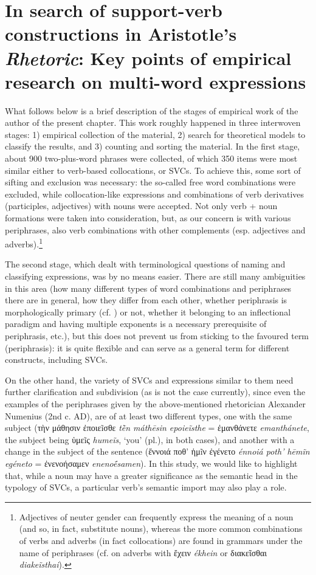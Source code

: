\documentclass[output=paper,colorlinks,citecolor=brown]{langscibook}
\begin{document}
\section{In search of support-verb constructions in Aristotle’s \textit{Rhetoric}: Key points of empirical research on multi-word expressions}\label{Section4Rhet}
\largerpage
What follows below is a brief description of the stages of empirical work of the author of the present chapter. This work roughly happened in three interwoven stages: 1) empirical collection of the material, 2) search for theoretical models to classify the results, and 3) counting and sorting the material. In the first stage, about 900 two-plus-word phrases were collected, of which 350 items were most similar either to verb-based collocations, or SVCs. To achieve this, some sort of sifting and exclusion was necessary: the so-called free word combinations were excluded, while collocation-like expressions and combinations of verb derivatives (participles, adjectives) with nouns were accepted. Not only verb + noun formations were taken into consideration, but, as our concern is with various periphrases, also verb combinations with other complements (esp. adjectives and adverbs).\footnote{Adjectives of neuter gender can frequently express the meaning of a noun (and so, in fact, substitute nouns), whereas the more common combinations of verbs and adverbs (in fact collocations) are found in grammars under the name of periphrases (cf. \citealt[§1438]{Smyth1920} on adverbs with ἔχειν \textit{ékhein} or διακεῖσθαι \textit{diakeĩsthai}).}

The second stage, which dealt with terminological questions of naming and classifying expressions, was by no means easier. There are still many ambiguities in this area (how many different types of word combinations and periphrases there are in general, how they differ from each other, whether periphrasis is morphologically primary (cf. \citealt[5]{Chumakina-Corbett2012}) or not, whether it belonging to an inflectional paradigm and having multiple exponents is a necessary prerequisite of periphrasis, etc.), but this does not prevent us from sticking to the favoured term (periphrasis): it is quite flexible and can serve as a general term for different constructs, including SVCs. 


On the other hand, the variety of SVCs and expressions similar to them need further clarification and subdivision (as is not the case currently), since even the examples of the periphrases given by the above-mentioned rhetorician Alexander Numenius (2nd c. AD), are of at least two different types, one with the same subject (τὴν μάθησιν ἐποιεĩσθε \textit{tḕn máthēsin epoieĩsthe} = ἐμανθάνετε \textit{emanthánete}, the subject being ὑμεĩς \textit{humeĩs}, ‘you’ (pl.), in both cases), and another with a change in the subject of the sentence (ἔννοιά ποθ' ἡμĩν ἐγένετο \textit{énnoiá poth' hēmĩn egéneto} = ἐνενοήσαμεν \textit{enenoḗsamen}). In this study, we would like to highlight that, while a noun may have a greater significance as the semantic head in the typology of SVCs, a particular verb’s semantic import may also play a role. 
\end{document}
